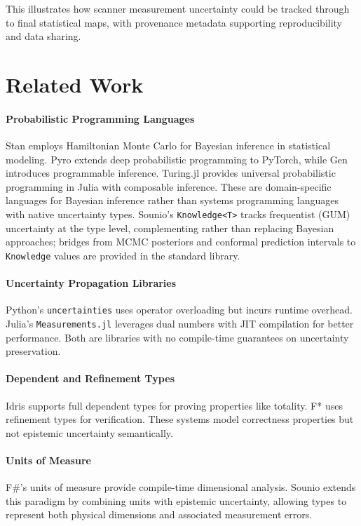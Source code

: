 \documentclass[11pt,a4paper]{article}
\begin{document}
This illustrates how scanner measurement uncertainty could be tracked
through to final statistical maps, with provenance metadata supporting
reproducibility and data sharing.

\section{Related Work}
\label{sec:related}

\paragraph{Probabilistic Programming Languages}
Stan \citep{carpenter2017stan} employs Hamiltonian Monte Carlo for Bayesian
inference in statistical modeling. Pyro \citep{bingham2019pyro} extends deep
probabilistic programming to PyTorch, while Gen \citep{cusumano2019gen}
introduces programmable inference. Turing.jl \citep{ge2018turing} provides
universal probabilistic programming in Julia with composable inference.
These are domain-specific languages for
Bayesian inference rather than systems programming languages with native
uncertainty types. Sounio's \texttt{Knowledge<T>} tracks frequentist (GUM)
uncertainty at the type level, complementing rather than replacing Bayesian
approaches; bridges from MCMC posteriors and conformal prediction intervals
to \texttt{Knowledge} values are provided in the standard library.

\paragraph{Uncertainty Propagation Libraries}
Python's \texttt{uncertainties} \citep{lebigot2024uncertainties} uses operator
overloading but incurs runtime overhead. Julia's \texttt{Measurements.jl}
\citep{giordano2016measurements} leverages dual numbers with JIT compilation
for better performance. Both are libraries with no compile-time guarantees
on uncertainty preservation.

\paragraph{Dependent and Refinement Types}
Idris \citep{brady2013idris} supports full dependent types for proving
properties like totality. F* \citep{swamy2016dependent} uses refinement
types for verification. These systems model correctness properties but
not epistemic uncertainty semantically.

\paragraph{Units of Measure}
F\#'s units of measure \citep{kennedy2009units} provide compile-time
dimensional analysis. Sounio extends this paradigm by combining units
with epistemic uncertainty, allowing types to represent both physical
dimensions and associated measurement errors.
\end{document}
